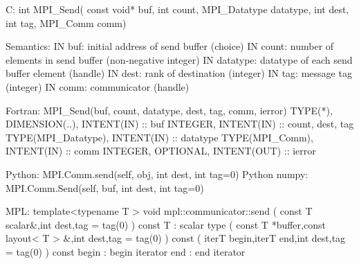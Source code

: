 C:
int MPI_Send(
  const void* buf, int count, MPI_Datatype datatype,
  int dest, int tag, MPI_Comm comm)

Semantics:
IN buf: initial address of send buffer (choice)
IN count: number of elements in send buffer (non-negative integer)
IN datatype: datatype of each send buffer element (handle)
IN dest: rank of destination (integer)
IN tag: message tag (integer)
IN comm: communicator (handle)

Fortran:
MPI_Send(buf, count, datatype, dest, tag, comm, ierror)
TYPE(*), DIMENSION(..), INTENT(IN) :: buf
INTEGER, INTENT(IN) :: count, dest, tag
TYPE(MPI_Datatype), INTENT(IN) :: datatype
TYPE(MPI_Comm), INTENT(IN) :: comm
INTEGER, OPTIONAL, INTENT(OUT) :: ierror 

Python:
MPI.Comm.send(self, obj, int dest, int tag=0)
Python numpy:
MPI.Comm.Send(self, buf, int dest, int tag=0)

MPL:
template<typename T >
void mpl::communicator::send
   ( const T scalar&,int dest,tag = tag(0) ) const
T : scalar type
   ( const T *buffer,const layout< T > &,int dest,tag = tag(0) ) const
   ( iterT begin,iterT end,int dest,tag = tag(0) ) const
begin : begin iterator
end : end iterator

